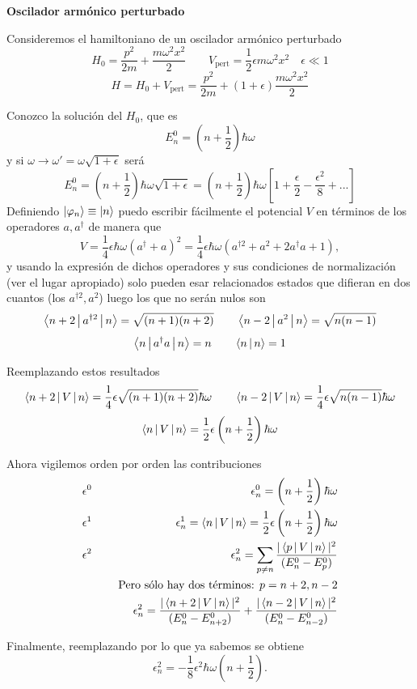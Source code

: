 \documentclass[10pt,oneside]{CBFT_book}
\begin{document}
\begin{ejemplo}{\bf Oscilador armónico perturbado}

Consideremos el hamiltoniano de un oscilador armónico perturbado
\[
	H_0 = \frac{p^2}{2m} + \frac{m\omega^2x^2}{2}
	\qquad
	V_{\text{pert}} = \frac{1}{2} \epsilon m \omega^2 x^2 
	\quad 
	\epsilon \ll 1
\]
\[
	H = H_0 + V_{\text{pert}} = \frac{p^2}{2m} + (1+\epsilon)\frac{m\omega^2x^2}{2}
\]

Conozco la solución del $H_0$, que es
\[
	E_n^0 = \left( n + \frac 1 2 \right) \hbar\omega
\]
y si $\omega \to \omega' = \omega\sqrt{1+\epsilon}$ será
\[
	E_n^0 = \left( n + \frac 1 2 \right) \hbar\omega\sqrt{1+\epsilon} =
	\left( n + \frac 1 2 \right) \hbar\omega
	\left[ 1 + \frac{\epsilon}{2} - \frac{\epsilon^2}{8} + ... \right]
\]
Definiendo $\Ket{\varphi_n}\equiv \Ket{n}$ puedo escribir fácilmente el potencial $V$ en
términos de los operadores $a,a^\dagger$ de manera que
\[
	V = \frac{1}{4} \epsilon \hbar \omega ( a^\dagger + a )^2 =
	\frac{1}{4} \epsilon \hbar \omega ( a^{\dagger 2} + a^2 + 2 a^\dagger a + 1 ),
\]
y usando la expresión de dichos operadores y sus condiciones de normalización (ver el lugar
apropiado) solo pueden esar relacionados estados que difieran en dos cuantos (los $a^{\dagger 2}, a^2$)
luego los que no serán nulos son
\[
	\Braket{n+2|a^{\dagger 2}|n} = \sqrt{(n+1)(n+2)} 
	\qquad 
	\Braket{n-2|a^{2}|n} = \sqrt{n(n-1)} 
\]
\[
	\Braket{n|a^{\dagger}a|n} = n
	\qquad
	\Braket{n|n} = 1
\]
 
Reemplazando estos resultados 
\[
	\Braket{n+2|V|n} = \frac{1}{4} \epsilon \sqrt{(n+1)(n+2)}  \hbar \omega
	\qquad 
	\Braket{n-2|V|n} = \frac{1}{4} \epsilon \sqrt{n(n-1)}  \hbar \omega
\] 
\[
	\Braket{n|V|n} = \frac{1}{2} \epsilon \left( n + \frac{1}{2}\right)  \hbar \omega
\]
 
Ahora vigilemos orden por orden las contribuciones 
\begin{eqnarray*}
 	\epsilon^0 & \quad & \epsilon_n^0 =  \left( n + \frac{1}{2}\right)  \hbar \omega\\
 	\epsilon^1 & \quad & \epsilon_n^1 = \Braket{n|V|n} =
 	\frac{1}{2} \epsilon \left( n + \frac{1}{2}\right)  \hbar \omega \\
 	\epsilon^2 & \quad & \epsilon_n^2 = \sum_{p\neq n} \frac{|\Braket{p|V|n}|^2}{(E_n^0 - E_p^0)}\\
 	& \quad & \text{ Pero sólo hay dos términos: } p=n+2, n-2 \\
 	& \quad & \epsilon_n^2 = \frac{|\Braket{n+2|V|n}|^2}{(E_n^0 - E_{n+2}^0)} + 
				\frac{|\Braket{n-2|V|n}|^2}{(E_n^0 - E_{n-2}^0)}
\end{eqnarray*}

Finalmente, reemplazando por lo que ya sabemos se obtiene
\[
	\epsilon_n^2 = - \frac{1}{8} \epsilon^2 \hbar \omega \left( n + \frac{1}{2}\right) .
\]
 
\end{ejemplo}
\end{document}
